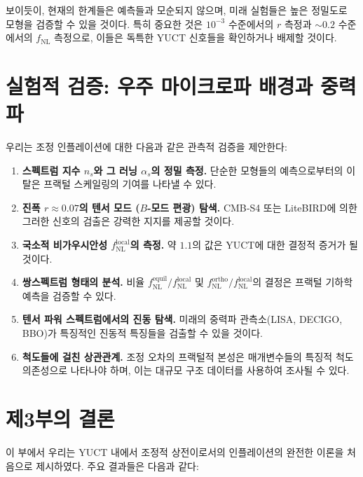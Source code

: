 \documentclass[11pt,a4paper]{article}
\begin{document}
	보이듯이, 현재의 한계들은 예측들과 모순되지 않으며, 미래 실험들은 높은 정밀도로 모형을 검증할 수 있을 것이다. 특히 중요한 것은 \(10^{-3}\) 수준에서의 \(r\) 측정과 \(\sim 0.2\) 수준에서의 \(f_{\text{NL}}\) 측정으로, 이들은 독특한 YUCT 신호들을 확인하거나 배제할 것이다.
	
	\section{실험적 검증: 우주 마이크로파 배경과 중력파}
	\label{sec:tests}
	
	우리는 조정 인플레이션에 대한 다음과 같은 관측적 검증을 제안한다:
	
	\begin{enumerate}
		\item \textbf{스펙트럼 지수 \(n_s\)와 그 러닝 \(\alpha_s\)의 정밀 측정.} 단순한 모형들의 예측으로부터의 이탈은 프랙털 스케일링의 기여를 나타낼 수 있다.
		\item \textbf{진폭 \(r \approx 0.07\)의 텐서 모드 (\(B\)-모드 편광) 탐색.} CMB‑S4 또는 LiteBIRD에 의한 그러한 신호의 검출은 강력한 지지를 제공할 것이다.
		\item \textbf{국소적 비가우시안성 \(f_{\text{NL}}^{\text{local}}\)의 측정.} 약 \(1.1\)의 값은 YUCT에 대한 결정적 증거가 될 것이다.
		\item \textbf{쌍스펙트럼 형태의 분석.} 비율 \(f_{\text{NL}}^{\text{equil}}/f_{\text{NL}}^{\text{local}}\) 및 \(f_{\text{NL}}^{\text{ortho}}/f_{\text{NL}}^{\text{local}}\)의 결정은 프랙털 기하학 예측을 검증할 수 있다.
		\item \textbf{텐서 파워 스펙트럼에서의 진동 탐색.} 미래의 중력파 관측소(LISA, DECIGO, BBO)가 특징적인 진동적 특징들을 검출할 수 있을 것이다.
		\item \textbf{척도들에 걸친 상관관계.} 조정 오차의 프랙털적 본성은 매개변수들의 특징적 척도 의존성으로 나타나야 하며, 이는 대규모 구조 데이터를 사용하여 조사될 수 있다.
	\end{enumerate}
	
	\section{제3부의 결론}
	\label{sec:conclusion-inflation}
	
	이 부에서 우리는 YUCT 내에서 조정적 상전이로서의 인플레이션의 완전한 이론을 처음으로 제시하였다. 주요 결과들은 다음과 같다:
	
\end{document}
